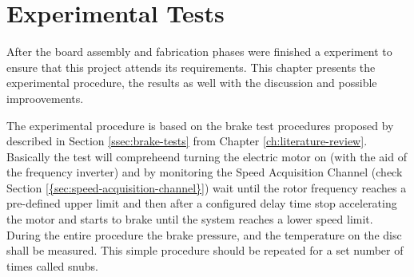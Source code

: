 \chapter{Experimental Tests}\label{ch:experimentalTests}
		After the board assembly and fabrication phases were finished a experiment to ensure that this project attends its requirements. This chapter presents the experimental procedure, the results as well with the discussion and possible improovements.
		\par
		The experimental procedure is based on the brake test procedures proposed by \cite{saej2522} described in Section \ref{ssec:brake-tests} from Chapter \ref{ch:literature-review}. Basically the test will compreheend turning the electric motor on (with the aid of the frequency inverter) and by monitoring the Speed Acquisition Channel (check Section \ref{{sec:speed-acquisition-channel}}) wait until the rotor frequency reaches a pre-defined upper limit and then after a configured delay time stop accelerating the motor and starts to brake until the system reaches a lower speed limit. During the entire procedure the brake pressure, and the temperature on the disc shall be measured. This simple procedure should be repeated for a set number of times called snubs. 

		
		
		